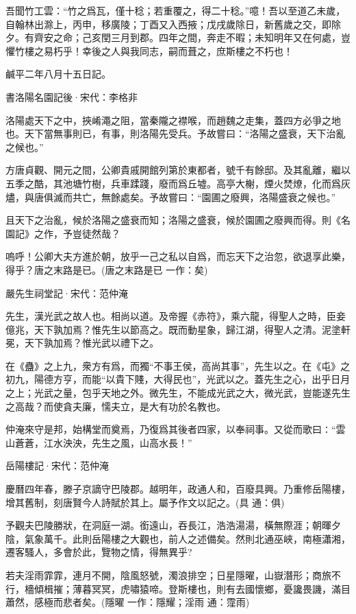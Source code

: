\documentclass[12pt,a4paper]{ctexbook}
\begin{document}
吾聞竹工雲：“竹之爲瓦，僅十稔；若重覆之，得二十稔。”噫！吾以至道乙未歲，自翰林出滁上，丙申，移廣陵；丁酉又入西掖；戊戌歲除日，新舊歲之交，即除夕。有齊安之命；己亥閏三月到郡。四年之間，奔走不暇；未知明年又在何處，豈懼竹樓之易朽乎！幸後之人與我同志，嗣而葺之，庶斯樓之不朽也！\par
鹹平二年八月十五日記。\par
書洛陽名園記後·宋代：李格非 \par
洛陽處天下之中，挾崤澠之阻，當秦隴之襟喉，而趙魏之走集，蓋四方必爭之地也。天下當無事則已，有事，則洛陽先受兵。予故嘗曰：“洛陽之盛衰，天下治亂之候也。”\par
方唐貞觀、開元之間，公卿貴戚開館列第於東都者，號千有餘邸。及其亂離，繼以五季之酷，其池塘竹樹，兵車蹂踐，廢而爲丘墟。高亭大榭，煙火焚燎，化而爲灰燼，與唐俱滅而共亡，無餘處矣。予故嘗曰：“園圃之廢興，洛陽盛衰之候也。”\par
且天下之治亂，候於洛陽之盛衰而知；洛陽之盛衰，候於園圃之廢興而得。則《名園記》之作，予豈徒然哉？\par
嗚呼！公卿大夫方進於朝，放乎一己之私以自爲，而忘天下之治忽，欲退享此樂，得乎？唐之末路是已。(唐之末路是已 一作：矣)\par
嚴先生祠堂記·宋代：范仲淹 \par
先生，漢光武之故人也。相尚以道。及帝握《赤符》，乘六龍，得聖人之時，臣妾億兆，天下孰加焉？惟先生以節高之。既而動星象，歸江湖，得聖人之清。泥塗軒冕，天下孰加焉？惟光武以禮下之。\par
在《蠱》之上九，衆方有爲，而獨“不事王侯，高尚其事”，先生以之。在《屯》之初九，陽德方亨，而能“以貴下賤，大得民也”，光武以之。蓋先生之心，出乎日月之上；光武之量，包乎天地之外。微先生，不能成光武之大，微光武，豈能遂先生之高哉？而使貪夫廉，懦夫立，是大有功於名教也。\par
仲淹來守是邦，始構堂而奠焉，乃復爲其後者四家，以奉祠事。又從而歌曰∶“雲山蒼蒼，江水泱泱，先生之風，山高水長！”\par
岳陽樓記·宋代：范仲淹 \par
慶曆四年春，滕子京謫守巴陵郡。越明年，政通人和，百廢具興。乃重修岳陽樓，增其舊制，刻唐賢今人詩賦於其上。屬予作文以記之。(具 通：俱)\par
予觀夫巴陵勝狀，在洞庭一湖。銜遠山，吞長江，浩浩湯湯，橫無際涯；朝暉夕陰，氣象萬千。此則岳陽樓之大觀也，前人之述備矣。然則北通巫峽，南極瀟湘，遷客騷人，多會於此，覽物之情，得無異乎?\par
若夫淫雨霏霏，連月不開，陰風怒號，濁浪排空；日星隱曜，山嶽潛形；商旅不行，檣傾楫摧；薄暮冥冥，虎嘯猿啼。登斯樓也，則有去國懷鄉，憂讒畏譏，滿目蕭然，感極而悲者矣。(隱曜 一作：隱耀；淫雨 通：霪雨)\par
\end{document}
